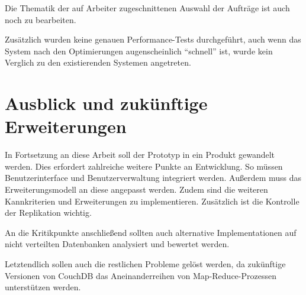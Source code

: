 Die Thematik der auf Arbeiter zugeschnittenen Auswahl der Aufträge ist auch noch zu bearbeiten.

Zusätzlich wurden keine genauen Performance-Tests durchgeführt,
auch wenn das System nach den Optimierungen augenscheinlich ``schnell'' ist,
wurde kein Verglich zu den existierenden Systemen angetreten.





\section{Ausblick und zukünftige Erweiterungen}
\label{sec:fazit:ausblick}
In Fortsetzung an diese Arbeit soll der Prototyp in ein Produkt gewandelt werden.
Dies erfordert zahlreiche weitere Punkte an Entwicklung.
So müssen Benutzerinterface und Benutzerverwaltung integriert werden.
Außerdem muss das Erweiterungsmodell an diese angepasst werden.
Zudem sind die weiteren Kannkriterien und Erweiterungen zu implementieren.
Zusätzlich ist die Kontrolle der Replikation wichtig.

An die Kritikpunkte anschließend sollten auch alternative Implementationen auf nicht verteilten Datenbanken analysiert und bewertet werden.

Letztendlich sollen auch die restlichen Probleme gelöst werden,
da zukünftige Versionen von CouchDB das Aneinanderreihen von Map-Reduce-Prozessen unterstützen werden.
